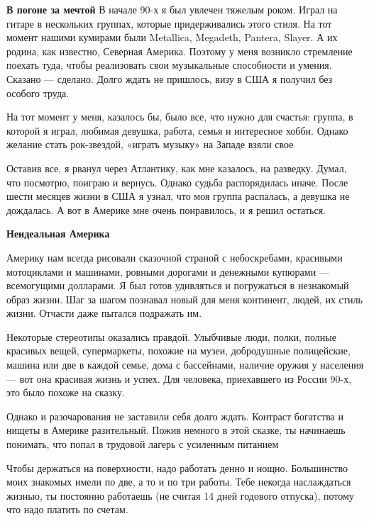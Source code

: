 \textbf{В погоне за мечтой}
В начале 90-х я был увлечен тяжелым роком. Играл на гитаре в нескольких группах, которые придерживались этого стиля. На тот момент нашими кумирами были Metallica, Megadeth, Pantera, Slayer. А их родина, как известно, Северная Америка. Поэтому у меня возникло стремление поехать туда, чтобы реализовать свои музыкальные способности и умения. Сказано — сделано. Долго ждать не пришлось, визу в США я получил без особого труда.

\begin{fancyquotes}
    На тот момент у меня, казалось бы, было все, что нужно для счастья: группа, в которой я играл, любимая девушка, работа, семья и интересное хобби. Однако желание стать рок-звездой, «играть музыку» на Западе взяли свое
\end{fancyquotes}

Оставив все, я рванул через Атлантику, как мне казалось, на разведку. Думал, что посмотрю, поиграю и вернусь. Однако судьба распорядилась иначе. После шести месяцев жизни в США я узнал, что моя группа распалась, а девушка не дождалась. А вот в Америке мне очень понравилось, и я решил остаться.


\textbf{Неидеальная Америка}

Америку нам всегда рисовали сказочной страной с небоскребами, красивыми мотоциклами и машинами, ровными дорогами и денежными купюрами — всемогущими долларами. Я был готов удивляться и погружаться в незнакомый образ жизни. Шаг за шагом познавал новый для меня континент, людей, их стиль жизни. Отчасти даже пытался подражать им.

Некоторые стереотипы оказались правдой. Улыбчивые люди, полки, полные красивых вещей, супермаркеты, похожие на музеи, добродушные полицейские, машина или две в каждой семье, дома с бассейнами, наличие оружия у населения — вот она красивая жизнь и успех. Для человека, приехавшего из России 90-х, это было похоже на сказку.

\begin{fancyquotes}
    Однако и разочарования не заставили себя долго ждать. Контраст богатства и нищеты в Америке разительный. Пожив немного в этой сказке, ты начинаешь понимать, что попал в трудовой лагерь с усиленным питанием
\end{fancyquotes}

Чтобы держаться на поверхности, надо работать денно и нощно. Большинство моих знакомых имели по две, а то и по три работы. Тебе некогда наслаждаться жизнью, ты постоянно работаешь (не считая 14 дней годового отпуска), потому что надо платить по счетам.

